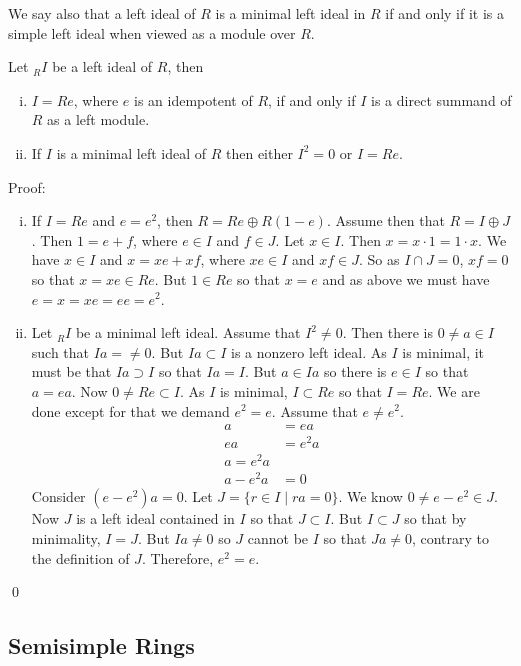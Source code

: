 We say also that a left ideal of $R$ is a minimal left ideal in $R$ if and only if it is a simple left ideal when viewed as a module over $R$. 

\begin{lem}\label{idemlemma}
Let $_R I$ be a left ideal of $R$, then
\begin{enumerate}[(i)]
\item $I=Re$, where $e$ is an idempotent of $R$, if and only if $I$ is a direct summand of $R$ as a left module.
\item If $I$ is a minimal left ideal of $R$ then either $I^2=0$ or $I=Re$. 
\end{enumerate}
\end{lem}

Proof: 
\begin{enumerate}[(i)]
\item If $I=Re$ and $e=e^2$, then $R=Re \oplus R(1-e)$. Assume then that $R=I \oplus J$. Then $1=e+f$, where $e \in I$ and $f \in J$. Let $x \in I$. Then $x=x \cdot 1=1 \cdot x$. We have $x \in I$ and $x=xe+xf$, where $xe \in I$ and $xf \in J$. So as $I \cap J=0$, $xf=0$ so that $x=xe \in Re$. But $1 \in Re$ so that $x=e$ and as above we must have $e=x=xe=ee=e^2$. 

\item Let $_R I$ be a minimal left ideal. Assume that $I^2 \neq 0$. Then there is $0 \neq a \in I$ such that $Ia= \neq 0$. But $Ia \subset I$ is a nonzero left ideal. As $I$ is minimal, it must be that $Ia \supset I$ so that $Ia=I$. But $a \in Ia$ so there is $e \in I$ so that $a=ea$. Now $0 \neq Re \subset I$. As $I$ is minimal, $I \subset Re$ so that $I=Re$. We are done except for that we demand $e^2=e$. Assume that $e \neq e^2$. 
\[
\begin{split}
a&=ea \\
ea&=e^2 a \\
a=e^2 a \\
a-e^2a&=0
\end{split}
\]
Consider $(e-e^2)a=0$. Let $J=\{r \in I \;|\; ra=0\}$. We know $0 \neq e-e^2 \in J$. Now $J$ is a left ideal contained in $I$ so that $J \subset I$. But $I \subset J$ so that by minimality, $I=J$. But $Ia \neq 0$ so $J$ cannot be $I$ so that $Ja \neq 0$, contrary to the definition of $J$. Therefore, $e^2=e$. 
\end{enumerate}
\qed \\


\subsection{Semisimple Rings}

